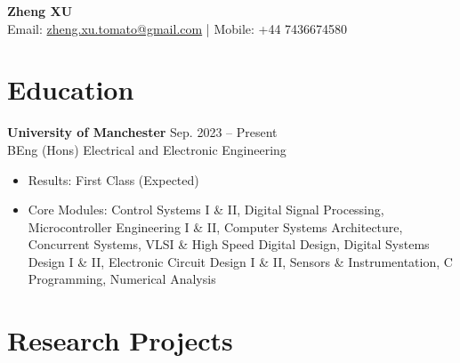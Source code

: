 \documentclass[11pt, a4paper]{article}
\newcommand{\entry}[2]{\textbf{#1} \hfill #2}
\begin{document}
\begin{center}
    {\LARGE \textbf{Zheng XU}} \\[4pt]
    Email: \href{mailto:zheng.xu.tomato@gmail.com}{zheng.xu.tomato@gmail.com} \quad | \quad Mobile: +44 7436674580
\end{center}

\section{Education}

\entry{University of Manchester}{Sep. 2023 -- Present} \\
BEng (Hons) Electrical and Electronic Engineering
\begin{itemize}[leftmargin=*, nosep, topsep=2pt]
    \item Results: First Class (Expected)
    \item Core Modules: Control Systems I \& II, Digital Signal Processing, Microcontroller Engineering I \& II, Computer Systems Architecture, Concurrent Systems, VLSI \& High Speed Digital Design, Digital Systems Design I \& II, Electronic Circuit Design I \& II, Sensors \& Instrumentation, C Programming, Numerical Analysis
\end{itemize}

\section{Research Projects}
\end{document}
